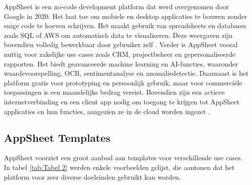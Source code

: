 AppSheet is een no-code development platform dat werd overgenomen door Google in 2020. Het laat toe om mobiele en desktop applicaties te bouwen zonder enige code te hoeven schrijven. Het maakt gebruik van spreadsheets en databases zoals SQL of AWS om automatisch data te visualiseren. Deze weergaven zijn bovendien volledig bewerkbaar door gebruiker zelf \autocite{AppSheet2020}. Verder is AppSheet vooral nuttig voor zakelijke use cases zoals CRM, projectbeheer en gepersonaliseerde rapporten. Het biedt geavanceerde machine learning en AI-functies, waaronder waardevoorspelling, OCR, sentimentanalyse en anomaliedetectie. Daarnaast is het platform gratis voor prototyping en persoonlijk gebruik, maar voor commerciële toepassingen is een maandelijks bedrag vereist. Bovendien zijn een actieve internetverbinding en een client app nodig om toegang te krijgen tot AppSheet applicaties en hun functies, aangezien ze in de cloud worden ingezet \autocite{Petrovic2020}. \\

\subsection{AppSheet Templates}
\label{subsec:appsheet_templates}

AppSheet voorziet een groot aanbod aan templates voor verschillende use cases. In tabel \ref{tab:Tabel 2} werden enkele voorbeelden gelijst, die aantonen dat het platform voor zeer diverse doeleinden gebruikt kan worden. 

